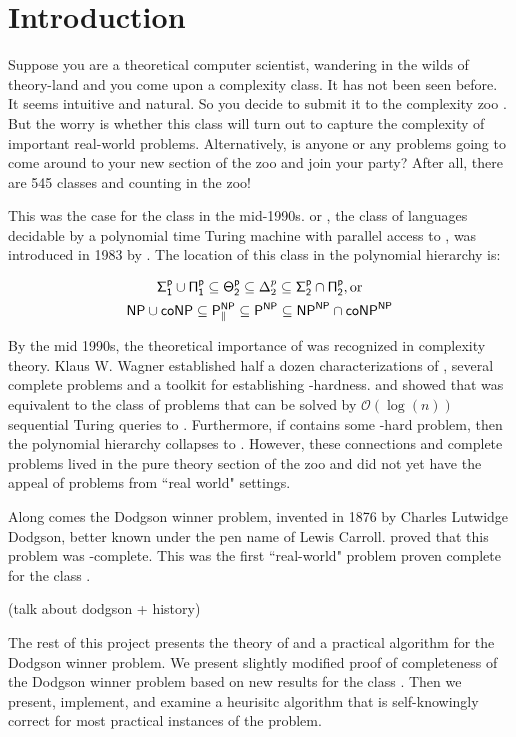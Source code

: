 \section{Introduction}\label{sec:intro}

    Suppose you are a theoretical computer scientist, wandering in the wilds
of theory-land and you come upon a complexity class.
It has not been seen before.
It seems intuitive and natural.
So you decide to submit it to the complexity zoo \citep{zoo}.
But the worry is whether this class will turn out to capture the complexity
of important real-world problems.
Alternatively, is anyone or any problems going to come around to your new
section of the zoo and join your party?
After all, there are 545 classes and counting
in the zoo!

This was the case for the class \tp in the mid-1990s.
\tp or , the class of
languages decidable by a polynomial time Turing machine with parallel access to
\np, was introduced in 1983 by \citep{PZ83}.
The location of this class in the polynomial hierarchy is:

\begin{gather*}
    \mathsf{\Sigma^{p}_{1}} \cup \mathsf{\Pi^{p}_{1}} \subseteq \mathsf{\Theta^{p}_2} \subseteq \Delta^{p}_2
    \subseteq \mathsf{\Sigma^{p}_{2}} \cap \mathsf{\Pi^{p}_{2}}, \text{or}\\
    \mathsf{NP} \cup \mathsf{coNP} \subseteq \mathsf{P}^{\mathsf{NP}}_{\parallel}
    \subseteq \mathsf{P}^{\mathsf{NP}} \subseteq \mathsf{NP}^{\mathsf{NP}} \cap \mathsf{coNP}^{\mathsf{NP}} \\
\end{gather*}


By the mid 1990s, the theoretical importance of \tp was recognized in complexity theory.
Klaus W. Wagner established half a dozen characterizations of \tp \cite{wag90},
several complete problems and a toolkit for establishing \tp-hardness.
\citet{hem87} and \citet{ksw87} showed that \tp was equivalent to the class of
problems that can be solved by $\mathcal{O}(\log(n))$ sequential Turing queries to \np.
Furthermore, if \np contains some \tp-hard problem, then the polynomial hierarchy
collapses to \np.
However, these connections and complete problems
lived in the pure theory section of the zoo and did not yet have the appeal of
problems from ``real world" settings.

Along comes the Dodgson winner problem, invented in 1876 by Charles Lutwidge
Dodgson, better known under the pen name of Lewis Carroll.
\citet{exactdodgson} proved that this problem was \tp-complete.
This was the first ``real-world" problem proven complete for the class \tp.

(talk about dodgson + history)

The rest of this project presents the theory of and a practical algorithm for
the Dodgson winner problem.
We present slightly modified proof of completeness of
the Dodgson winner problem based on new results for the class \tp.
Then we present, implement, and examine a heurisitc algorithm
that is self-knowingly correct for most practical instances of the problem.




